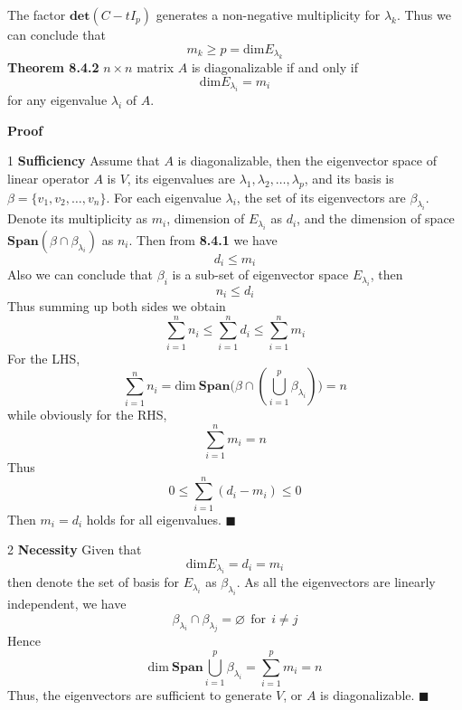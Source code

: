 \documentclass[11pt]{article}
\begin{document}
The factor $\bm{det}(C-tI_{p})$ generates a non-negative multiplicity for $\lambda_k$. Thus we can conclude that
\begin{equation}
m_k \geq p = \text{dim}E_{\lambda_k}
\end{equation}
\textbf{Theorem 8.4.2} $n\times n$ matrix $A$ is diagonalizable if and only if
\begin{equation}
    \text{dim}E_{\lambda_i} = m_i
\end{equation}
for any eigenvalue $\lambda_i$ of $A$. \par \noindent 
\textbf{Proof} \par \noindent \textcircled{\small{1}} \textbf{Sufficiency} Assume that $A$ is diagonalizable, then the eigenvector space of linear operator $A$ is $V$, its eigenvalues are $\lambda_1, \lambda_2, \dots, \lambda_p$, and its basis is $\beta = \{v_1,v_2,\dots,v_n\}$. For each eigenvalue $\lambda_i$, the set of its eigenvectors are $\beta_{\lambda_i} $. Denote its multiplicity as $m_i$, dimension of $E_{\lambda_i}$ as $d_i$, and the dimension of space $\bm{Span}(\beta \cap \beta_{\lambda_i})  $ as $n_i$. Then from \textbf{8.4.1} we have
\begin{equation}
    d_i \leq m_i
\end{equation}
Also we can conclude that $\beta_i$ is a sub-set of eigenvector space $E_{\lambda_i}$, then
\begin{equation}
    n_i \leq d_i
\end{equation}
Thus summing up both sides we obtain
\begin{equation}
    \sum_{i=1}^n n_i \leq \sum_{i=1}^n d_i \leq \sum_{i=1}^{n} m_i
\end{equation}
For the LHS,
\begin{equation}
    \sum_{i=1}^{n}n_i = \text{dim}~\bm{Span}\bigg(\beta \cap (\bigcup_{i=1}^{p}\beta_{\lambda_i})\bigg) = n
\end{equation}
while obviously for the RHS,
\begin{equation}
    \sum_{i=1}^{n}m_i = n
\end{equation}
Thus
\begin{equation}
    0\leq \sum_{i=1}^{n}(d_i-m_i) \leq 0
\end{equation}
Then $m_i = d_i$ holds for all eigenvalues.  \hfill $\blacksquare$ \par \noindent \textcircled{\small{2}} \textbf{Necessity} Given that
\begin{equation}
    \text{dim}E_{\lambda_i} = d_i = m_i
\end{equation}
then denote the set of basis for $E_{\lambda_i}$ as $\beta_{\lambda_i}$. As all the eigenvectors are linearly independent, we have
\begin{equation}
    \beta_{\lambda_i} \cap \beta_{\lambda_j} = \varnothing ~~\text{for}~~i\neq j
\end{equation}
Hence
\begin{equation}
    \text{dim}~\bm{Span} \bigcup_{i=1}^{p} \beta_{\lambda_i} = \sum_{i=1}^{p}m_i = n
\end{equation}
Thus, the eigenvectors are sufficient to generate $V$, or $A$ is diagonalizable.     \hfill$\blacksquare$
\clearpage
\end{document}
